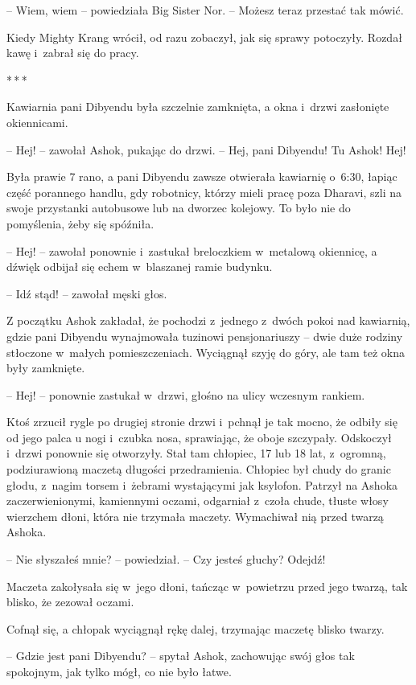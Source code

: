 \documentclass[oneside,polish,11pt,rmheadings]{mwbk}
\newcommand{\threeast}{\par\centerline{*\,*\,*}\medskip\par}
\begin{document}
-- Wiem, wiem -- powiedziała Big Sister Nor. -- Możesz teraz przestać tak mówić.

Kiedy Mighty Krang wrócił, od razu zobaczył, jak się sprawy potoczyły. Rozdał kawę i~zabrał się do pracy.

\bigskip
\threeast

Kawiarnia pani Dibyendu była szczelnie zamknięta, a okna i~drzwi zasłonięte okiennicami.

-- Hej! -- zawołał Ashok, pukając do drzwi. -- Hej, pani Dibyendu! Tu Ashok! Hej!

 Była prawie 7 rano, a pani Dibyendu zawsze otwierała kawiarnię o~6:30, łapiąc część porannego handlu, gdy robotnicy, którzy mieli pracę poza Dharavi, szli na swoje przystanki autobusowe lub na dworzec kolejowy. To było nie do pomyślenia, żeby się spóźniła. 

-- Hej! -- zawołał ponownie i~zastukał breloczkiem w~metalową okiennicę, a dźwięk odbijał się echem w~blaszanej ramie budynku.

-- Idź stąd! -- zawołał męski głos. 

Z początku Ashok zakładał, że pochodzi z~jednego z~dwóch pokoi nad kawiarnią, gdzie pani Dibyendu wynajmowała tuzinowi pensjonariuszy -- dwie duże rodziny stłoczone w~małych pomieszczeniach. Wyciągnął szyję do góry, ale tam też okna były zamknięte.

-- Hej! -- ponownie zastukał w~drzwi, głośno na ulicy wczesnym rankiem.

Ktoś zrzucił rygle po drugiej stronie drzwi i~pchnął je tak mocno, że odbiły się od jego palca u nogi i~czubka nosa, sprawiając, że oboje szczypały. Odskoczył i~drzwi ponownie się otworzyły. Stał tam chłopiec, 17 lub 18 lat, z~ogromną, podziurawioną maczetą długości przedramienia. Chłopiec był chudy do granic głodu, z~nagim torsem i~żebrami wystającymi jak ksylofon. Patrzył na Ashoka zaczerwienionymi, kamiennymi oczami, odgarniał z~czoła chude, tłuste włosy wierzchem dłoni, która nie trzymała maczety. Wymachiwał nią przed twarzą Ashoka.

-- Nie słyszałeś mnie? -- powiedział. -- Czy jesteś głuchy? Odejdź! 

Maczeta zakołysała się w~jego dłoni, tańcząc w~powietrzu przed jego twarzą, tak blisko, że zezował oczami.

Cofnął się, a chłopak wyciągnął rękę dalej, trzymając maczetę blisko twarzy. 

-- Gdzie jest pani Dibyendu? -- spytał Ashok, zachowując swój głos tak spokojnym, jak tylko mógł, co nie było łatwe.
\end{document}
